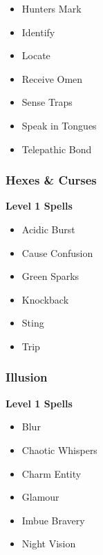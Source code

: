 \begin{multicols}{4}
\begin{itemize}[itemsep=0em]
\item Hunter\apos{}s Mark

\item Identify

\item Locate

\item Receive Omen

\item Sense Traps

\item Speak in Tongues

\item Telepathic Bond


\end{itemize}
\subsubsection{Hexes \& Curses}
\textbf{Level 1 Spells}
\begin{itemize}[itemsep=0em]
\renewcommand\labelitemi{-}
\item Acidic Burst

\item Cause Confusion

\item Green Sparks

\item Knockback

\item Sting

\item Trip


\end{itemize}
\vfill\null
\columnbreak\subsubsection{Illusion}
\textbf{Level 1 Spells}
\begin{itemize}[itemsep=0em]
\renewcommand\labelitemi{-}
\item Blur

\item Chaotic Whispers

\item Charm Entity

\item Glamour

\item Imbue Bravery

\item Night Vision


\end{itemize}
\end{multicols}
